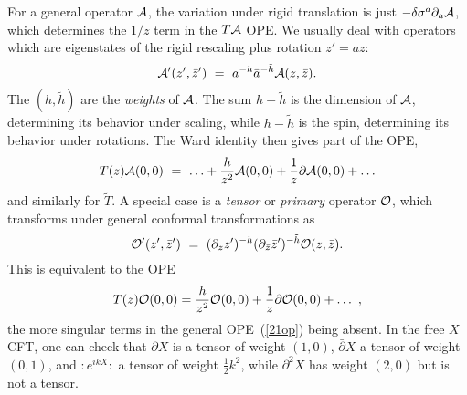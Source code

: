 For a general operator $\cal A$, the variation under rigid
translation is just $-\delta \sigma^a \partial_a {\cal A}$, which
determines the
$1/z$ term in the $T{\cal A}$ OPE.  We usually deal with operators
which are eigenstates of the rigid rescaling plus rotation $z' =
a z$:
\begin{equation}
{\cal A}' (z',\bar z')\ =\ a^{-h} \bar a^{-\tilde h}
{\cal A} (z,\bar z).
\end{equation}
The $(h,\tilde h)$ are the {\it weights} of
${\cal A}$.  The sum $h+\tilde h$ is the dimension of $\cal A$,
determining its behavior under scaling, while $h - \tilde h$ is the
spin, determining its behavior under rotations.  The Ward identity
then gives part of the OPE,
\begin{equation}
T(z) {\cal A}(0,0)\ =\ \ldots + \frac{h}{z^2} {\cal A}(0,0)
+ \frac{1}{z} \partial {\cal A}(0,0) + \ldots \label{21op}
\end{equation}
and similarly for $\tilde T$.  A special
case is a {\it tensor} or {\it primary} operator ${\cal O}$, which
transforms under general conformal transformations as
\begin{equation}
{\cal O}' (z',\bar z')\ =\ (\partial_z z')^{-h}
(\partial_{\bar z} \bar z')^{-\tilde h} {\cal O} (z,\bar z).
\end{equation}
This is equivalent to the OPE
\begin{equation}
T(z) {\cal O}(0,0) = \frac{h}{z^2} {\cal O}(0,0)
+ \frac{1}{z} \partial {\cal O}(0,0) + \ldots \ ,  \label{prop}
\end{equation}
the more singular terms in the general OPE~(\ref{21op}) being
absent.  In the free $X$ CFT, one can check that $\partial X$
is a tensor of weight $(1,0)$, $\bar\partial X$ a tensor of weight
$(0,1)$, and $:\! e^{ikX} \! :$ a tensor of weight $\frac{1}{2}
k^2$, while $\partial^2 X$ has weight $(2,0)$ but is not a tensor.

